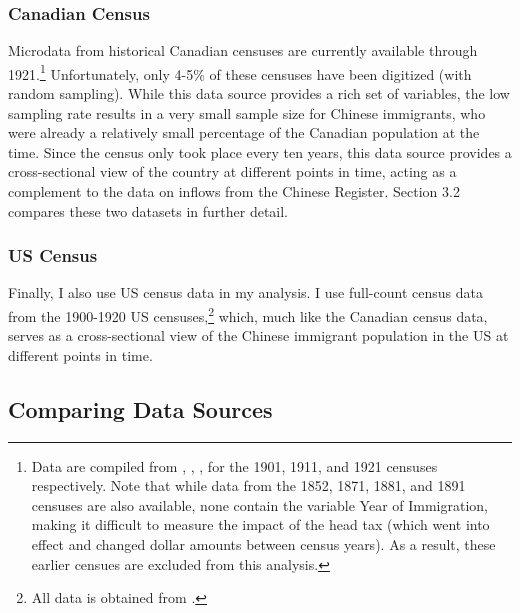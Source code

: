 \documentclass[12pt]{article}
\begin{document}
\subsubsection{Canadian Census}
Microdata from historical Canadian censuses are currently available through 1921.\footnote{Data are compiled from \citet{census1901}, \citet{census1911}, \citet{census1921}, for the 1901, 1911, and 1921 censuses respectively. Note that while data from the 1852, 1871, 1881, and 1891 censuses are also available, none contain the variable Year of Immigration, making it difficult to measure the impact of the head tax (which went into effect and changed dollar amounts between census years). As a result, these earlier censues are excluded from this analysis.} 
Unfortunately, only 4-5\% of these censuses have been digitized (with random sampling). While this data source provides a rich set of variables, the low sampling rate results in a very small sample size for Chinese immigrants, who were already a relatively small percentage of the Canadian population at the time. 
Since the census only took place every ten years, this data source provides a cross-sectional view of the country at different points in time, acting as a complement to the data on inflows from the Chinese Register.
Section 3.2 compares these two datasets in further detail.

\subsubsection{US Census}
Finally, I also use US census data in my analysis. I use full-count census data from the 1900-1920 US censuses,\footnote{All data is obtained from \citet{ipums}.} which, much like the Canadian census data, serves as a cross-sectional view of the Chinese immigrant population in the US at different points in time.

\subsection{Comparing Data Sources}
\end{document}
